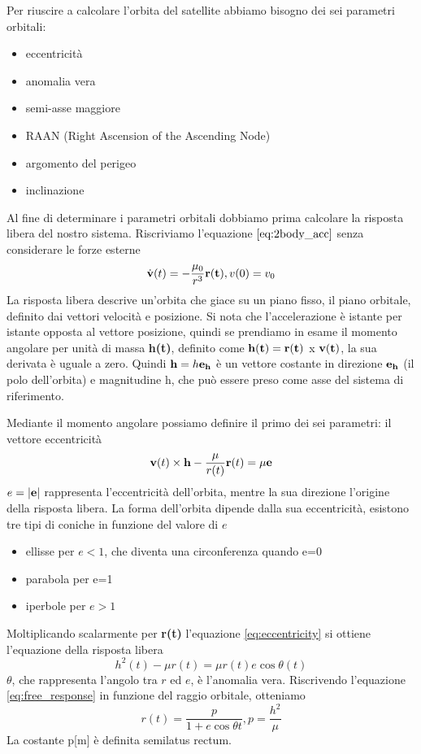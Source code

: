 Per riuscire a calcolare l'orbita del satellite abbiamo bisogno dei sei
parametri orbitali:
\begin{itemize}
  \item eccentricità
  \item anomalia vera
  \item semi-asse maggiore
  \item RAAN (Right Ascension of the Ascending Node)
  \item argomento del perigeo
  \item inclinazione
\end{itemize}

Al fine di determinare i parametri orbitali dobbiamo prima calcolare la risposta
libera del nostro sistema. Riscriviamo l'equazione $\ref{eq:2body_acc}$ senza
considerare le forze esterne
\begin{equation}
\dot{\bf v}(t)=-\frac{\mu_0}{r^3}{\bf r(t)}, v(0)=v_0
\label{eq:free_response}
\end{equation}
La risposta libera descrive un'orbita che giace su un piano fisso, il piano
orbitale, definito dai vettori velocità e posizione. Si nota che l'accelerazione
è istante per istante opposta al vettore posizione, quindi se prendiamo in esame
il momento angolare per unità di massa {\bf h(t)}, definito come ${\bf
h(t)}={\bf r(t)}$ x ${\bf v(t)}$, la sua derivata è uguale a zero. Quindi ${\bf
h}=h{\bf e_h}$ è un vettore costante in direzione ${\bf e_h}$ (il polo dell'orbita) e
magnitudine h, che può essere preso come asse del sistema di riferimento.

Mediante il momento angolare possiamo definire il primo dei sei
parametri: il vettore eccentricità
\begin{equation}
{\bf v}(t) \times {\bf h} - \frac{\mu}{r(t)}{\bf r}(t)=\mu{\bf e}
\label{eq:eccentricity}
\end{equation}
$e=|{\bf e}|$ rappresenta  l'eccentricità dell'orbita, mentre la sua direzione
l'origine della risposta libera. La forma dell'orbita dipende dalla sua
eccentricità, esistono tre tipi di coniche in funzione del valore di $e$
\begin{itemize}
  \item ellisse per $e<1$, che diventa una circonferenza quando e=0
  \item parabola per e=1 
  \item iperbole per $e>1$
\end{itemize}
Moltiplicando scalarmente per {\bf r(t)} l'equazione \ref{eq:eccentricity} si ottiene l'equazione
della risposta libera
\begin{equation}
h^2(t)-\mu r(t)=\mu r(t)e \cos{\theta(t)}
\label{eq:free_response}
\end{equation}
$\theta$, che rappresenta l'angolo tra $r$ ed $e$, è l'anomalia vera.
Riscrivendo l'equazione \ref{eq:free_response} in funzione del raggio orbitale,
otteniamo
\begin{equation}
r(t)=\frac{p}{1+e\cos{\theta{t}}} , p=\frac{h^2}{\mu}
\end{equation}
La costante p[m] è definita semilatus rectum.

